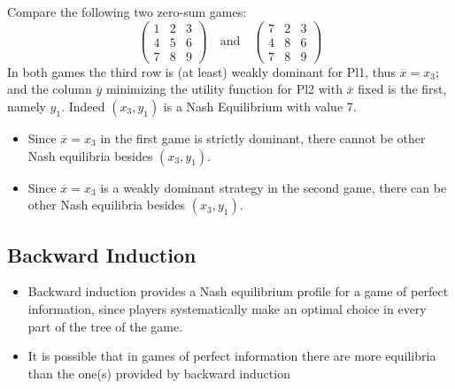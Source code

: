 \documentclass[../main.tex]{subfiles}
\begin{document}
\begin{example}
    Compare the following two zero-sum games:
    \[
        \begin{pmatrix}
            1 & 2 & 3 \\
            4 & 5 & 6 \\
            7 & 8 & 9
        \end{pmatrix}
        \quad \text{and} \quad
        \begin{pmatrix}
            7 & 2 & 3 \\
            4 & 8 & 6 \\
            7 & 8 & 9
        \end{pmatrix}
    \]
    In both games the third row is (at least) weakly dominant for Pl1, thus $\overline{x} = x_3$; and the column $\overline{y}$ minimizing the utility function for Pl2 with $\overline{x}$ fixed is the first, namely $y_1$. Indeed $(x_3, y_1)$ is a Nash Equilibrium with value 7.
    \begin{itemize}
        \item Since $\overline{x} = x_3$ in the first game is strictly dominant, there cannot be other Nash equilibria besides $(x_3, y_1)$.
        \item Since $\overline{x} = x_3$ is a weakly dominant strategy in the second game, there can be other Nash equilibria besides $(x_3, y_1)$.
    \end{itemize}
\end{example}

\subsection{Backward Induction}
\begin{itemize}
    \item Backward induction provides a Nash equilibrium profile for a game of perfect information, since players systematically make an optimal choice in every part of the tree of the game.
    \item It is possible that in games of perfect information there are more equilibria than the one(s) provided by backward induction
\end{itemize}
\end{document}
